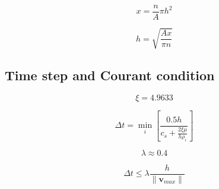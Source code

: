 \documentclass[11pt,norsk,a4paper]{article}
\begin{document}
\begin{equation}
    x = \frac{n}{A} \pi h^2
\end{equation}

\begin{equation}
    h = \sqrt{\frac{A x}{\pi n}}
\end{equation}

\subsection{Time step and Courant condition}

\begin{equation}
    \xi = 4.9633
\end{equation}

\begin{equation}
    \Delta t = \operatorname*{min}_{i} \left[ \frac{0.5 h}{c_s + \frac{2 \xi \mu}{h \rho_i}} \right]
\end{equation}

\begin{equation}
    \lambda \approx 0.4
\end{equation}

\begin{equation}
    \Delta t \le \lambda \frac{h}{\lVert \mathbf{v}_{max} \rVert}
\end{equation}
\end{document}
